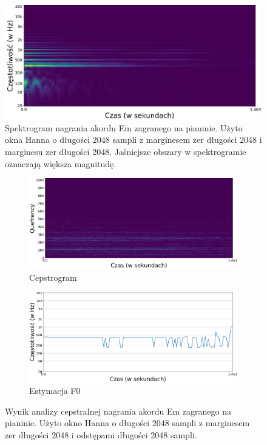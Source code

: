 \documentclass[12pt,a4paper,twoside]{mwart}
\begin{document}
\begin{figure}[H]
  \begin{center}
    \includegraphics[scale=0.27]{images/Em/spectrogram_Em_2048_512_cropped.png}
    \caption{Spektrogram nagrania akordu Em zagranego na pianinie. Użyto okna Hanna o długości 2048 sampli z marginesem zer długości 2048 i marginesu zer długości 2048. Jaśniejsze obszary w spektrogramie oznaczają większa magnitudę.}
    \label{fig:multi:em:spectrogram}
  \end{center}
\end{figure}

\begin{figure}[H]
  \begin{subfigure}{0.5\textwidth}
    \includegraphics[width=1.\linewidth]{images/Em/cepstrogram_cropped.png}
    \caption{Cepstrogram}
  \end{subfigure}
  \begin{subfigure}{0.49\textwidth}
    \includegraphics[width=1.\linewidth]{images/Em/cepstra_estimation_cropped.png}
    \caption{Estymacja F0}
    \label{fig:multi:ceps:estimation}
  \end{subfigure}
  \caption{Wynik analizy cepstralnej nagrania akordu Em zagranego na pianinie. Użyto okno Hanna o długości 2048 sampli z marginesem zer długości 2048 i odstępami długości 2048 sampli.}
  \label{fig:multi:ceps}
\end{figure}
\end{document}
